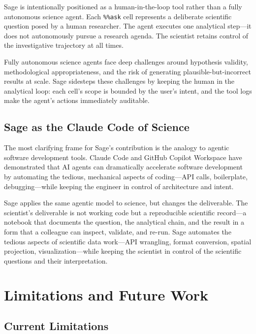 \documentclass[10pt,twocolumn]{article}
\begin{document}
Sage is intentionally positioned as a human-in-the-loop tool rather than a fully autonomous science agent. Each \texttt{\%\%ask} cell represents a deliberate scientific question posed by a human researcher. The agent executes one analytical step---it does not autonomously pursue a research agenda. The scientist retains control of the investigative trajectory at all times.

Fully autonomous science agents face deep challenges around hypothesis validity, methodological appropriateness, and the risk of generating plausible-but-incorrect results at scale. Sage sidesteps these challenges by keeping the human in the analytical loop: each cell's scope is bounded by the user's intent, and the tool logs make the agent's actions immediately auditable.

\subsection{Sage as the Claude Code of Science}

The most clarifying frame for Sage's contribution is the analogy to agentic software development tools. Claude Code and GitHub Copilot Workspace have demonstrated that AI agents can dramatically accelerate software development by automating the tedious, mechanical aspects of coding---API calls, boilerplate, debugging---while keeping the engineer in control of architecture and intent.

Sage applies the same agentic model to science, but changes the deliverable. The scientist's deliverable is not working code but a reproducible scientific record---a notebook that documents the question, the analytical chain, and the result in a form that a colleague can inspect, validate, and re-run. Sage automates the tedious aspects of scientific data work---API wrangling, format conversion, spatial projection, visualization---while keeping the scientist in control of the scientific questions and their interpretation.

\section{Limitations and Future Work}

\subsection{Current Limitations}
\end{document}
